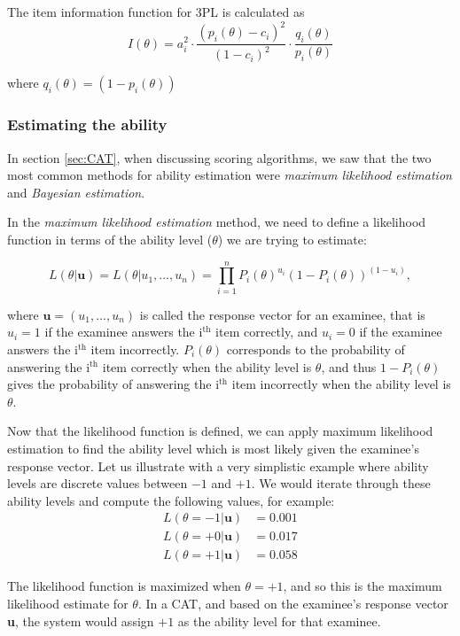 The item information function for 3PL is calculated as
$$I(\theta) = a_i^2 \cdot \dfrac{(p_i(\theta)-c_i)^2}{(1-c_i)^2} \cdot \dfrac{q_i(\theta)}{p_i(\theta)}$$

where $q_i(\theta) = (1-p_i(\theta))$

\subsubsection{Estimating the ability}
In section \ref{sec:CAT}, when discussing scoring algorithms, we saw that the two most common methods for ability estimation were \textit{maximum likelihood estimation} and \textit{Bayesian estimation}.\newline

In the \textit{maximum likelihood estimation} method, we need to define a likelihood function in terms of the ability level ($\theta$) we are trying to estimate:

\begin{equation*}
L(\theta | \textbf{u}) = L(\theta | u_1, ..., u_n) = \prod_{i=1}^n P_i(\theta)^{u_i}(1 - P_i(\theta))^{(1 - u_i)} ,
\end{equation*}

where $\textbf{u}=(u_1, ..., u_n)$ is called the response vector for an examinee, that is $u_i=1$ if the examinee answers the i$^\text{th}$ item correctly, and $u_i=0$ if the examinee answers the i$^\text{th}$ item incorrectly. $P_i(\theta)$ corresponds to the probability of answering the i$^\text{th}$ item correctly when the ability level is $\theta$, and thus $1 - P_i(\theta)$ gives the probability of answering the i$^\text{th}$ item incorrectly when the ability level is $\theta$. \newline

Now that the likelihood function is defined, we can apply maximum likelihood estimation to find the ability level which is most likely given the examinee's response vector. Let us illustrate with a very simplistic example where ability levels are discrete values between $-1$ and $+1$. We would iterate through these ability levels and compute the following values, for example:
\begin{align*}
L(\theta=-1 | \textbf{u}) &= 0.001 \\
L(\theta=+0 | \textbf{u}) &= 0.017 \\
L(\theta=+1 | \textbf{u}) &= 0.058
\end{align*}

The likelihood function is maximized when $\theta = +1$, and so this is the maximum likelihood estimate for $\theta$. In a CAT, and based on the examinee's response vector \textbf{u}, the system would assign $+1$ as the ability level for that examinee.\newline

